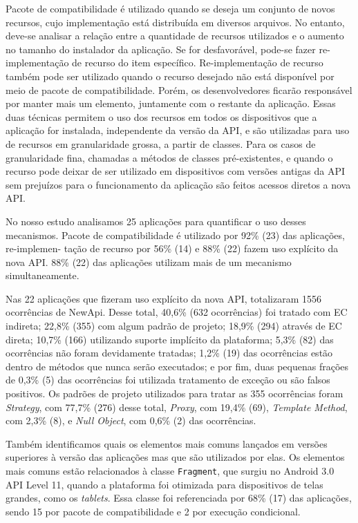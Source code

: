 Pacote de compatibilidade é utilizado quando se deseja um conjunto de novos recursos,
cujo implementação está distribuída em diversos arquivos. No entanto, deve-se analisar
a relação entre a quantidade de recursos utilizados e o aumento no tamanho do instalador
da aplicação. Se for desfavorável, pode-se fazer re-implementação de recurso do item específico. Re-implementação de recurso também pode ser utilizado quando o recurso desejado
não está disponível por meio de pacote de compatibilidade. Porém, os desenvolvedores ficarão 
responsável por manter mais um elemento, juntamente com o restante da aplicação. Essas duas 
técnicas permitem o uso dos recursos em todos os dispositivos que a aplicação for instalada, 
independente da versão da API, e são utilizadas para uso de recursos em granularidade grossa,
a partir de classes. Para os casos de granularidade fina, chamadas a métodos de classes 
pré-existentes, e quando o recurso pode deixar de ser utilizado em dispositivos com versões 
antigas da API sem prejuízos para o funcionamento da aplicação são feitos acessos diretos a 
nova API.

No nosso estudo analisamos 25 aplicações para quantificar o uso desses mecanismos.
Pacote de compatibilidade é utilizado por 92\% (23) das aplicações, re-implemen- tação
de recurso por 56\% (14) e 88\% (22) fazem uso explícito da nova API. 88\% (22) das
aplicações utilizam mais de um mecanismo simultaneamente. 

Nas 22 aplicações que fizeram uso explícito da nova API, totalizaram 1556 ocorrências
de NewApi. Desse total, 40,6\% (632 ocorrências) foi tratado com EC indireta; 22,8\%
(355) com algum padrão de projeto; 18,9\% (294) através de EC direta; 10,7\% (166)
utilizando suporte implícito da plataforma; 5,3\% (82) das ocorrências não foram devidamente 
tratadas; 1,2\% (19) das ocorrências estão dentro de métodos que nunca serão executados;
e por fim, duas pequenas frações de 0,3\% (5) das ocorrências foi utilizada tratamento
de exceção ou são falsos positivos. Os padrões de projeto utilizados para tratar as 355
ocorrências foram \textit{Strategy}, com 77,7\% (276) desse total, \textit{Proxy}, 
com 19,4\% (69), \textit{Template Method}, com 2,3\% (8), e \textit{Null Object},
com 0,6\% (2) das ocorrências. 

Também identificamos quais os elementos mais comuns lançados em versões superiores
à versão das aplicações mas que são utilizados por elas. Os elementos mais comuns
estão relacionados à classe \texttt{Fragment}, que surgiu no Android 3.0 API Level
11, quando a plataforma foi otimizada para dispositivos de telas grandes, como os
\textit{tablets}. Essa classe foi referenciada por 68\% (17) das aplicações, sendo
15 por pacote de compatibilidade e 2 por execução condicional.

